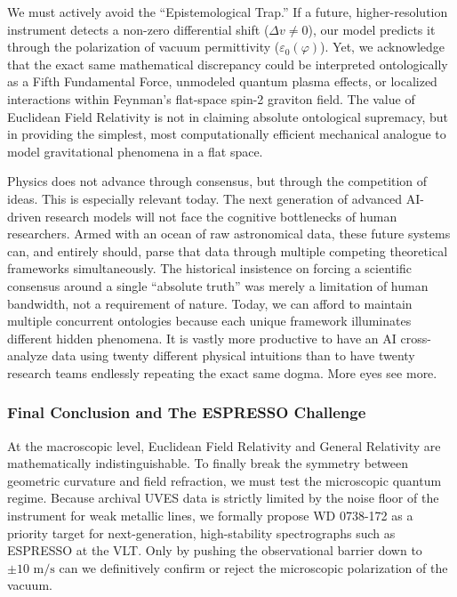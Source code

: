 \documentclass[
]{article}
\begin{document}
We must actively avoid the ``Epistemological Trap.'' If a future,
higher-resolution instrument detects a non-zero differential shift
(\(\Delta v \neq 0\)), our model predicts it through the polarization of
vacuum permittivity (\(\varepsilon_0(\varphi)\)). Yet, we acknowledge
that the exact same mathematical discrepancy could be interpreted
ontologically as a Fifth Fundamental Force, unmodeled quantum plasma
effects, or localized interactions within Feynman's flat-space spin-2
graviton field. The value of Euclidean Field Relativity is not in
claiming absolute ontological supremacy, but in providing the simplest,
most computationally efficient mechanical analogue to model
gravitational phenomena in a flat space.

Physics does not advance through consensus, but through the competition
of ideas. This is especially relevant today. The next generation of
advanced AI-driven research models will not face the cognitive
bottlenecks of human researchers. Armed with an ocean of raw
astronomical data, these future systems can, and entirely should, parse
that data through multiple competing theoretical frameworks
simultaneously. The historical insistence on forcing a scientific
consensus around a single ``absolute truth'' was merely a limitation of
human bandwidth, not a requirement of nature. Today, we can afford to
maintain multiple concurrent ontologies because each unique framework
illuminates different hidden phenomena. It is vastly more productive to
have an AI cross-analyze data using twenty different physical intuitions
than to have twenty research teams endlessly repeating the exact same
dogma. More eyes see more.

\subsubsection{Final Conclusion and The ESPRESSO
Challenge}\label{final-conclusion-and-the-espresso-challenge}

At the macroscopic level, Euclidean Field Relativity and General
Relativity are mathematically indistinguishable. To finally break the
symmetry between geometric curvature and field refraction, we must test
the microscopic quantum regime. Because archival UVES data is strictly
limited by the noise floor of the instrument for weak metallic lines, we
formally propose WD 0738-172 as a priority target for next-generation,
high-stability spectrographs such as ESPRESSO at the VLT. Only by
pushing the observational barrier down to \(\pm 10 \text{ m/s}\) can we
definitively confirm or reject the microscopic polarization of the
vacuum.
\end{document}
